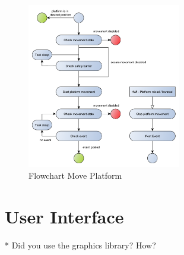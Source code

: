 \begin{figure}[H]
	\begin{center}
		\includegraphics[width=0.6\textwidth]{media/Flow_Chart_MovePlatform.pdf} 	
		\caption{Flowchart Move Platform}
		\label{fig:moveplatform}
	\end{center}
\end{figure}



\section{User Interface} %
* Did you use the graphics library? How?\\



